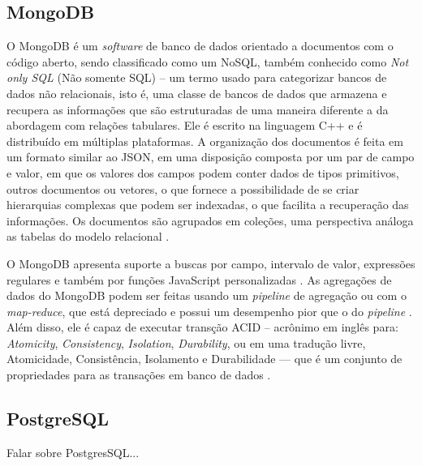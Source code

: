 \subsection{MongoDB}
\label{subsec:mongo}
O MongoDB é um \textit{software} de banco de dados orientado a documentos com o código aberto, sendo classificado como um NoSQL, também conhecido como \textit{Not only SQL} (Não somente SQL) – um termo usado para categorizar bancos de dados não relacionais, isto é, uma classe de bancos de dados que armazena e recupera as informações que são estruturadas de uma maneira diferente a da abordagem com relações tabulares. Ele é escrito na linguagem C++ e é distribuído em múltiplas plataformas. A organização dos documentos é feita em um formato similar ao JSON, em uma disposição composta por um par de campo e valor, em que os valores dos campos podem conter dados de tipos primitivos, outros documentos ou vetores, o que fornece a possibilidade de se criar hierarquias complexas que podem ser indexadas, o que facilita a recuperação das informações. Os documentos são agrupados em coleções, uma perspectiva análoga as tabelas do modelo relacional \cite{mongoDB2021}.

O MongoDB apresenta suporte a buscas por campo, intervalo de valor, expressões regulares e também por funções JavaScript personalizadas \cite{mongoDB2021}. As agregações de dados do MongoDB podem ser feitas usando um \textit{pipeline} de agregação ou com o \textit{map-reduce}, que está depreciado e possui um desempenho pior que o do \textit{pipeline} \cite{mongoDBagregacao}. Além disso, ele é capaz de executar transção ACID – acrônimo em inglês para: \textit{Atomicity}, \textit{Consistency}, \textit{Isolation}, \textit{Durability}, ou em uma tradução livre, Atomicidade, Consistência, Isolamento e Durabilidade — que é um conjunto de propriedades para as transações em banco de dados \cite{mongoDBACID}.


\subsection{PostgreSQL}
\label{subsec:postgres}
Falar sobre PostgresSQL...
